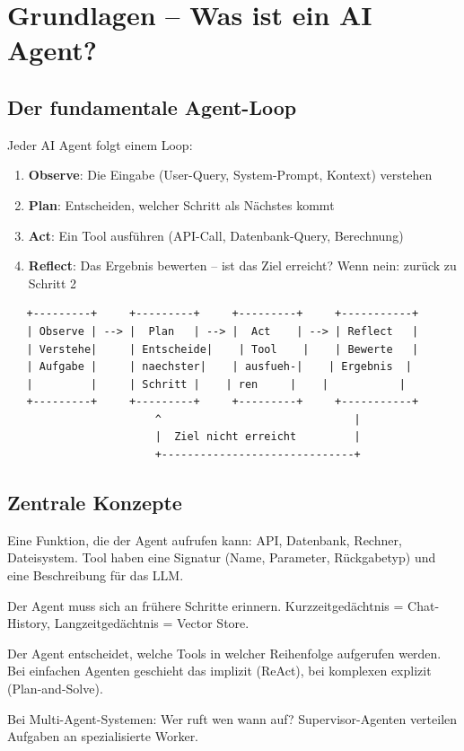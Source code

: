 \section{Grundlagen -- Was ist ein AI Agent?}

\subsection{Der fundamentale Agent-Loop}

Jeder AI Agent folgt einem Loop:

\begin{enumerate}[leftmargin=*]
    \item \textbf{Observe}: Die Eingabe (User-Query, System-Prompt, Kontext) verstehen
    \item \textbf{Plan}: Entscheiden, welcher Schritt als Nächstes kommt
    \item \textbf{Act}: Ein Tool ausführen (API-Call, Datenbank-Query, Berechnung)
    \item \textbf{Reflect}: Das Ergebnis bewerten -- ist das Ziel erreicht? Wenn nein: zurück zu Schritt 2
\end{enumerate}

\begin{verbatim}
   +---------+     +---------+     +---------+     +-----------+
   | Observe | --> |  Plan   | --> |  Act    | --> | Reflect   |
   | Verstehe|     | Entscheide|    | Tool    |    | Bewerte   |
   | Aufgabe |     | naechster|    | ausfueh-|    | Ergebnis  |
   |         |     | Schritt |    | ren     |    |           |
   +---------+     +---------+     +---------+     +-----------+
                       ^                              |
                       |  Ziel nicht erreicht         |
                       +------------------------------+
\end{verbatim}

\subsection{Zentrale Konzepte}

\begin{description}[leftmargin=*,style=nextline]
    \item[Tool] Eine Funktion, die der Agent aufrufen kann: API, Datenbank, Rechner, Dateisystem. Tool haben eine Signatur (Name, Parameter, Rückgabetyp) und eine Beschreibung für das LLM.
    \item[Memory] Der Agent muss sich an frühere Schritte erinnern. Kurzzeitgedächtnis = Chat-History, Langzeitgedächtnis = Vector Store.
    \item[Planning] Der Agent entscheidet, welche Tools in welcher Reihenfolge aufgerufen werden. Bei einfachen Agenten geschieht das implizit (ReAct), bei komplexen explizit (Plan-and-Solve).
    \item[Orchestration] Bei Multi-Agent-Systemen: Wer ruft wen wann auf? Supervisor-Agenten verteilen Aufgaben an spezialisierte Worker.
\end{description}

